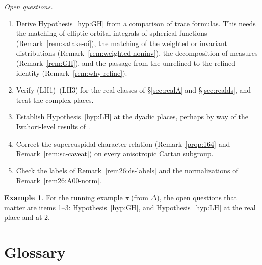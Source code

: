 \documentclass[12pt,letterpaper]{book}
\theoremstyle{plain}
\theoremstyle{definition}
\newtheorem{example}[theorem]{Example}
\theoremstyle{remark}
\theoremstyle{remark}
\begin{document}
\emph{Open questions.}
\begin{enumerate}
\item Derive Hypothesis~\ref{hyp:GH} from a comparison of trace formulas.
This needs the matching of elliptic orbital integrals of spherical
functions (Remark~\ref{rem:satake-oi}), the matching of the weighted or
invariant distributions (Remark~\ref{rem:weighted-noninv}), the
decomposition of measures (Remark~\ref{rem:GH}), and the passage from the
unrefined to the refined identity (Remark~\ref{rem:why-refine}).
\item Verify (LH1)--(LH3) for the real classes of \S\ref{sec:realA} and
\S\ref{sec:realds}, and treat the complex places.
\item Establish Hypothesis~\ref{hyp:LH} at the dyadic places, perhaps by
way of the Iwahori-level results of \cite{TW}.
\item Correct the supercuspidal character relation (Remark~\ref{prop:164}
and Remark~\ref{rem:sc-caveat}) on every anisotropic Cartan subgroup.
\item Check the labels of Remark~\ref{rem26:ds-labels} and the
normalizations of Remark~\ref{rem26:A00-norm}.
\end{enumerate}

\begin{example}
For the running example $\pi$ (from $\Delta$), the open questions that
matter are items 1--3: Hypothesis~\ref{hyp:GH}, and
Hypothesis~\ref{hyp:LH} at the real place and at $2$.
\end{example}



\chapter*{Glossary}
\end{document}
